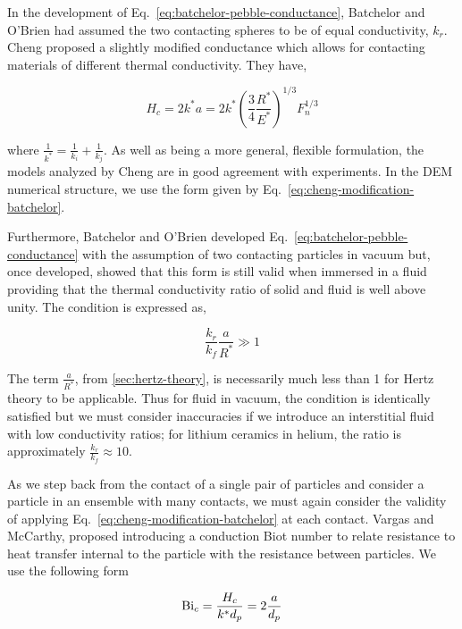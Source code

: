 In the development of Eq.~\ref{eq:batchelor-pebble-conductance}, Batchelor and O'Brien had assumed the two contacting spheres to be of equal conductivity, $k_r$. Cheng\etal\cite{Cheng19994199} proposed a slightly modified conductance which allows for contacting materials of different thermal conductivity. They have,

\begin{equation}\label{eq:cheng-modification-batchelor}
	H_c = 2k^*a = 2k^* \left(\frac{3}{4}\frac{R^*}{E^*}\right)^{1/3}F_n^{1/3}
\end{equation}

where $\frac{1}{k^*} = \frac{1}{k_i} + \frac{1}{k_j}$. As well as being a more general, flexible formulation, the models analyzed by Cheng\etal\cite{Cheng19994199} are in good agreement with experiments. In the DEM numerical structure, we use the form given by Eq.~\ref{eq:cheng-modification-batchelor}.

Furthermore, Batchelor and O'Brien developed Eq.~\ref{eq:batchelor-pebble-conductance} with the assumption of two contacting particles in vacuum but, once developed, showed\cite{Batchelor1977} that this form is still valid when immersed in a fluid providing that the thermal conductivity ratio of solid and fluid is well above unity. The condition is expressed as,

\begin{equation}\label{eq:conductance-validity-fluid}
	\frac{ k_r }{ k_f } \frac{a}{R^*} \gg 1
\end{equation}

The term $\frac{a}{R^*}$, from \cref{sec:hertz-theory}, is necessarily much less than 1 for Hertz theory to be applicable. Thus for fluid in vacuum, the condition is identically satisfied but we must consider inaccuracies if we introduce an interstitial fluid with low conductivity ratios; for lithium ceramics in helium, the ratio is approximately $\frac{k_r}{k_f} \approx 10$.

As we step back from the contact of a single pair of particles and consider a particle in an ensemble with many contacts, we must again consider the validity of applying Eq.~\ref{eq:cheng-modification-batchelor} at each contact. Vargas and McCarthy\cite{Vargas2002a}, proposed introducing a conduction Biot number to relate resistance to heat transfer internal to the particle with the resistance between particles. We use the following form

\begin{equation}
	\mathrm{Bi}_c = \frac{H_c}{k^* d_p} = 2\frac{a}{d_p}
\end{equation}

